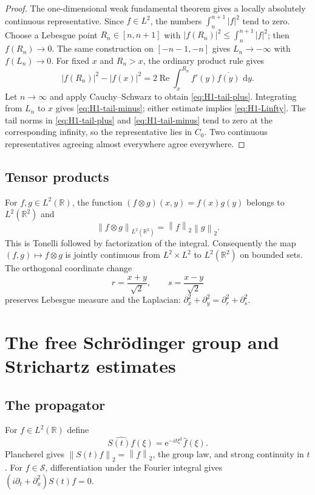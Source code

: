 \documentclass[11pt,oneside]{book}
\theoremstyle{definition}
\theoremstyle{remark}
\newcommand{\R}{\mathbb R}
\newcommand{\Ssch}{\mathcal S}
\newcommand{\1}{\mathbf 1}
\newcommand{\Rea}{\operatorname{Re}}
\newcommand{\dd}{\,\mathrm d}
\newcommand{\norm}[1]{\left\lVert #1\right\rVert}
\newcommand{\e}{\mathrm e}
\begin{document}
\begin{proof}
The one-dimensional weak fundamental theorem gives a locally absolutely
continuous representative.  Since $f\in L^2$, the numbers
$\int_n^{n+1}|f|^2$ tend to zero.  Choose a Lebesgue point
$R_n\in[n,n+1]$ with
$|f(R_n)|^2\le\int_n^{n+1}|f|^2$; then $f(R_n)\to0$.  The same construction
on $[-n-1,-n]$ gives $L_n\to-\infty$ with $f(L_n)\to0$.  For fixed $x$
and $R_n>x$, the ordinary product rule gives
\[
 |f(R_n)|^2-|f(x)|^2
 =2\Rea\int_x^{R_n}f'(y)\overline{f(y)}\,\dd y.
\]
Let $n\to\infty$ and apply Cauchy--Schwarz to obtain
\eqref{eq:H1-tail-plus}.  Integrating from $L_n$ to $x$ gives
\eqref{eq:H1-tail-minus}; either estimate implies \eqref{eq:H1-Linfty}.
The tail norms in \eqref{eq:H1-tail-plus} and
\eqref{eq:H1-tail-minus} tend to zero at the corresponding infinity, so the
representative lies in $C_0$.  Two continuous representatives agreeing
almost everywhere agree everywhere.
\end{proof}

\section{Tensor products}
For $f,g\in L^2(\R)$, the function $(f\otimes g)(x,y)=f(x)g(y)$ belongs to
$L^2(\R^2)$ and
\begin{equation}
  \norm{f\otimes g}_{L^2(\R^2)}=\norm f_2\norm g_2. \label{eq:tensor-norm}
\end{equation}
This is Tonelli followed by factorization of the integral.  Consequently the
map $(f,g)\mapsto f\otimes g$ is jointly continuous from $L^2\times L^2$ to
$L^2(\R^2)$ on bounded sets.  The orthogonal coordinate change
\[
 r=\frac{x+y}{\sqrt2},\qquad s=\frac{x-y}{\sqrt2}
\]
preserves Lebesgue measure and the Laplacian:
$\partial_x^2+\partial_y^2=\partial_r^2+\partial_s^2$.

\chapter{The free Schr\"odinger group and Strichartz estimates}

\section{The propagator}
For $f\in L^2(\R)$ define
\begin{equation}
 \widehat{S(t)f}(\xi)=\e^{-it\xi^2}\widehat f(\xi). \label{eq:free-group}
\end{equation}
Plancherel gives $\norm{S(t)f}_2=\norm f_2$, the group law, and strong
continuity in $t$.  For $f\in\Ssch$, differentiation under the Fourier
integral gives $(i\partial_t+\partial_x^2)S(t)f=0$.
\end{document}
